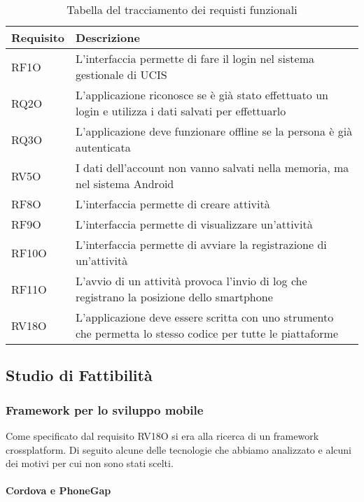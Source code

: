 \renewcommand{\arraystretch}{2}
\begin{longtable}{|p{4cm}|p{10cm}|}%
  \caption{Tabella del tracciamento dei requisti funzionali} 
  \label{tab:requisiti} \\
  
    \hline
    \textbf{Requisito} & \textbf{Descrizione} \\
    \hline
    \endhead
    RF1O     & L'interfaccia permette di fare il login nel sistema gestionale di UCIS \\ \hline
    RQ2O     & L'applicazione riconosce se è già stato effettuato un login e utilizza i dati salvati per effettuarlo \\ \hline
    RQ3O     & L'applicazione deve funzionare offline se la persona è già autenticata \\ \hline
    RV5O     & I dati dell'account non vanno salvati nella memoria, ma nel sistema Android \\ \hline
    RF8O     & L'interfaccia permette di creare attività \\ \hline
    RF9O     & L'interfaccia permette di visualizzare un'attività \\ \hline
    RF10O     & L'interfaccia permette di avviare la registrazione di un'attività \\ \hline
    RF11O     & L'avvio di un attività provoca l'invio di log che registrano la posizione dello smartphone \\ \hline
    RV18O     & L'applicazione deve essere scritta con uno strumento che permetta lo stesso codice per tutte le piattaforme \\ \hline
\end{longtable}%


\subsection{Studio di Fattibilità}

\subsubsection{Framework per lo sviluppo mobile}
Come specificato dal requisito RV18O si era alla ricerca di un framework crossplatform. Di seguito alcune delle tecnologie che abbiamo analizzato e alcuni dei motivi per
cui non sono stati scelti.

\paragraph{Cordova e PhoneGap}

